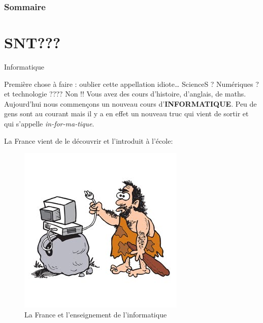 \documentclass[french]{beamer}
\begin{document}
\begin{frame}
 \frametitle{Sommaire}
{\scriptsize
\begin{multicols}{2} 
 \tableofcontents
\end{multicols}
}

 
 \end{frame}

\normalsize





























\section{SNT???}

\begin{frame}[fragile]{Informatique}
\protect\hypertarget{informatique}{}


Première chose à faire : oublier cette appellation idiote\ldots{}
\pause ScienceS ? \pause Numériques ? \pause et technologie ????
\pause
Non !! Vous avez des cours d'histoire, d'anglais, de maths. Aujourd'hui
nous commençons un nouveau cours d'\textbf{INFORMATIQUE}.
\pause
Peu de gens sont au courant mais il y a en effet un nouveau truc qui
vient de sortir et qui s'appelle \pause \emph{in-for-ma-tique}.


\end{frame}

\begin{frame}
   La France vient
de le découvrir et l'introduit à l'école:\pause
\begin{figure}
\centering
\includegraphics{./caveman.jpg}
\caption{La France et l'enseignement de l'informatique}
\end{figure}
\end{frame}
\end{document}
